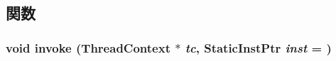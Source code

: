 \subsection{関数}
\hypertarget{classFaultBase_a2bd783b42262278d41157d428e1f8d6f}{
\subsubsection[{invoke}]{\setlength{\rightskip}{0pt plus 5cm}void invoke ({\bf ThreadContext} $\ast$ {\em tc}, \/  {\bf StaticInstPtr} {\em inst} = {})}}
\label{classFaultBase_a2bd783b42262278d41157d428e1f8d6f}


